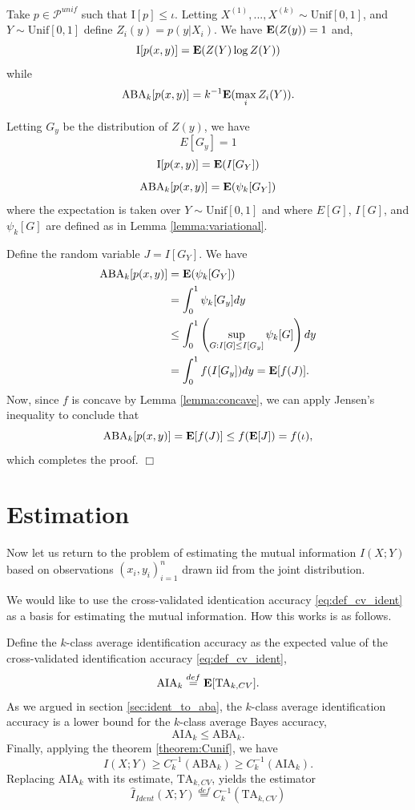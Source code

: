 Take $p \in \mathcal{P}^{unif}$ such that $\text{I}[p] \leq \iota$.
Letting $X^{(1)},...,X^{(k)} \sim \text{Unif}[0,1]$, and $Y \sim \text{Unif}[0,1]$ define $Z_i(y) = p(y|X_i)$.
We have $\textbf{E}(Z(y)) = 1$ and,
\[
\text{I}[p(x,y)] = \textbf{E}(Z(Y) \log Z(Y))
\]
while
\[
\text{ABA}_k[p(x,y)] = k^{-1}\textbf{E}(\max_i Z_i(Y)).
\]

Letting $G_y$ be the distribution of $Z(y)$, we have
\[
E[G_y] = 1
\]
\[
\text{I}[p(x,y)] = \textbf{E}(I[G_Y])
\]
\[
\text{ABA}_k[p(x,y)] = \textbf{E}(\psi_k[G_Y])
\]
where the expectation is taken over $Y \sim \text{Unif}[0,1]$ and
where $E[G]$, $I[G]$, and $\psi_k[G]$ are defined as in
Lemma \ref{lemma:variational}.

Define the random variable $J = I[G_Y]$.
We have
\begin{align*}
\text{ABA}_k[p(x,y)] &= \textbf{E}(\psi_k[G_Y])
\\&= \int_0^1 \psi_k[G_y] dy
\\&\leq \int_0^1 \left(\sup_{G: I[G] \leq I[G_y]} \psi_k[G]\right) dy
\\&= \int_0^1 f(I[G_y]) dy = \textbf{E}[f(J)].
\end{align*}
Now, since $f$ is concave by Lemma \ref{lemma:concave},
we can apply Jensen's inequality to conclude that
\[
\text{ABA}_k[p(x,y)] = \textbf{E}[f(J)] \leq f(\textbf{E}[J]) = f(\iota),
\]
which completes the proof. $\Box$



\section{Estimation}\label{sec:ch4_estimation}

Now let us return to the problem of estimating the mutual information
$I(X; Y)$ based on observations $(x_i, y_i)_{i=1}^n$ drawn iid from
the joint distribution.

We would like to use the cross-validated identication accuracy
\eqref{eq:def_cv_ident} as a basis for estimating the mutual
information.  How this works is as follows.

Define the $k$-class average identification accuracy as the expected
value of the cross-validated identification accuracy \eqref{eq:def_cv_ident},
\[
\text{AIA}_k \stackrel{def}{=} \textbf{E}[\text{TA}_{k, CV}].
\]
As we argued in section \ref{sec:ident_to_aba}, the $k$-class average
identification accuracy is a lower bound for the $k$-class average
Bayes accuracy,
\[
\text{AIA}_k \leq \text{ABA}_k.
\]
Finally, applying the theorem \ref{theorem:Cunif}, we have
\[
I(X; Y) \geq C^{-1}_k(\text{ABA}_k) \geq C^{-1}_k(\text{AIA}_k).
\]
Replacing $\text{AIA}_k$ with its estimate, $\text{TA}_{k, CV}$, yields the estimator
\[
\hat{I}_{Ident}(X; Y) \stackrel{def}{=} C^{-1}_k(\text{TA}_{k, CV}) 
\]


